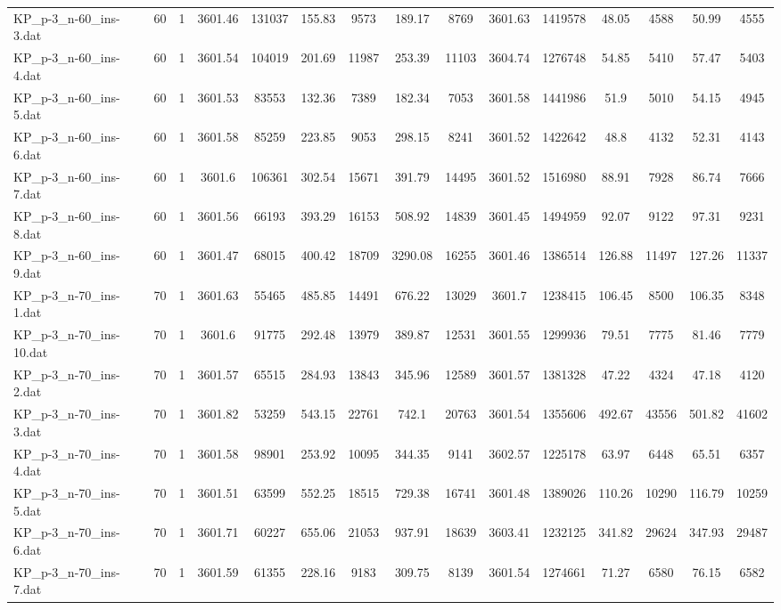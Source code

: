 \begin{table}[!ht]
{\begin{tabular}{lcccccccccccccc}
KP\_p-3\_n-60\_ins-3.dat & 60 & 1 & 3601.46 & 131037 & 155.83 & 9573 & 189.17 & 8769 & 3601.63 & 1419578 & 48.05 & 4588 & 50.99 & 4555 \\
KP\_p-3\_n-60\_ins-4.dat & 60 & 1 & 3601.54 & 104019 & 201.69 & 11987 & 253.39 & 11103 & 3604.74 & 1276748 & 54.85 & 5410 & 57.47 & 5403 \\
KP\_p-3\_n-60\_ins-5.dat & 60 & 1 & 3601.53 & 83553 & 132.36 & 7389 & 182.34 & 7053 & 3601.58 & 1441986 & 51.9 & 5010 & 54.15 & 4945 \\
KP\_p-3\_n-60\_ins-6.dat & 60 & 1 & 3601.58 & 85259 & 223.85 & 9053 & 298.15 & 8241 & 3601.52 & 1422642 & 48.8 & 4132 & 52.31 & 4143 \\
KP\_p-3\_n-60\_ins-7.dat & 60 & 1 & 3601.6 & 106361 & 302.54 & 15671 & 391.79 & 14495 & 3601.52 & 1516980 & 88.91 & 7928 & 86.74 & 7666 \\
KP\_p-3\_n-60\_ins-8.dat & 60 & 1 & 3601.56 & 66193 & 393.29 & 16153 & 508.92 & 14839 & 3601.45 & 1494959 & 92.07 & 9122 & 97.31 & 9231 \\
KP\_p-3\_n-60\_ins-9.dat & 60 & 1 & 3601.47 & 68015 & 400.42 & 18709 & 3290.08 & 16255 & 3601.46 & 1386514 & 126.88 & 11497 & 127.26 & 11337 \\
KP\_p-3\_n-70\_ins-1.dat & 70 & 1 & 3601.63 & 55465 & 485.85 & 14491 & 676.22 & 13029 & 3601.7 & 1238415 & 106.45 & 8500 & 106.35 & 8348 \\
KP\_p-3\_n-70\_ins-10.dat & 70 & 1 & 3601.6 & 91775 & 292.48 & 13979 & 389.87 & 12531 & 3601.55 & 1299936 & 79.51 & 7775 & 81.46 & 7779 \\
KP\_p-3\_n-70\_ins-2.dat & 70 & 1 & 3601.57 & 65515 & 284.93 & 13843 & 345.96 & 12589 & 3601.57 & 1381328 & 47.22 & 4324 & 47.18 & 4120 \\
KP\_p-3\_n-70\_ins-3.dat & 70 & 1 & 3601.82 & 53259 & 543.15 & 22761 & 742.1 & 20763 & 3601.54 & 1355606 & 492.67 & 43556 & 501.82 & 41602 \\
KP\_p-3\_n-70\_ins-4.dat & 70 & 1 & 3601.58 & 98901 & 253.92 & 10095 & 344.35 & 9141 & 3602.57 & 1225178 & 63.97 & 6448 & 65.51 & 6357 \\
KP\_p-3\_n-70\_ins-5.dat & 70 & 1 & 3601.51 & 63599 & 552.25 & 18515 & 729.38 & 16741 & 3601.48 & 1389026 & 110.26 & 10290 & 116.79 & 10259 \\
KP\_p-3\_n-70\_ins-6.dat & 70 & 1 & 3601.71 & 60227 & 655.06 & 21053 & 937.91 & 18639 & 3603.41 & 1232125 & 341.82 & 29624 & 347.93 & 29487 \\
KP\_p-3\_n-70\_ins-7.dat & 70 & 1 & 3601.59 & 61355 & 228.16 & 9183 & 309.75 & 8139 & 3601.54 & 1274661 & 71.27 & 6580 & 76.15 & 6582 \\

\end{tabular}}
\end{table}
